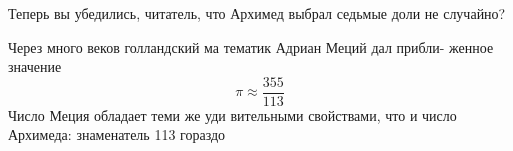 \begin{multicols}{2}
    Теперь вы убедились, читатель, что Архимед выбрал седьмые доли не случайно?
    
    Через много веков голландский ма тематик Адриан Меций дал прибли- женное значение
    \[\pi \approx \frac{355}{113}\]
    Число Меция обладает теми же уди вительными свойствами, что и число Архимеда: знаменатель 113 гораздо 
\end{multicols}
% 
